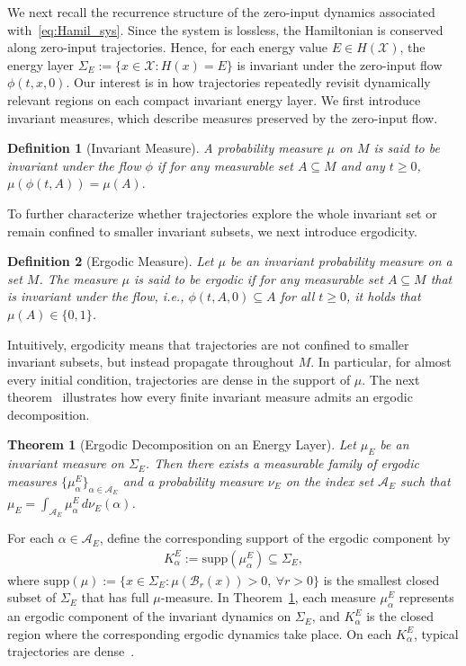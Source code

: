 \documentclass[letterpaper, 10 pt, conference]{ieeeconf}
\newtheorem{definition}{Definition}
\newtheorem{theorem}{Theorem}
\newcommand{\X}{\mathcal{X}}
\newcommand{\supp}{\mathrm{supp}}
\newcommand{\cB}{\mathcal{B}}
\newcommand{\cA}{\mathcal{A}}
\begin{document}
We next recall the recurrence structure of the zero-input dynamics associated with~\eqref{eq:Hamil_sys}. Since the system is lossless, the Hamiltonian is conserved along zero-input trajectories. Hence, for each energy value $E\in H(\X)$, the energy layer $\Sigma_E:=\{x\in\X:H(x)=E\}$
is invariant under the zero-input flow $\phi(t,x,0)$. Our interest is in how trajectories repeatedly revisit dynamically relevant regions on each compact invariant energy layer. We first introduce invariant measures, which describe measures preserved by the zero-input flow.


\begin{definition}[Invariant Measure]
A probability measure $\mu$ on $M$ is said to be invariant under the flow $\phi$ if for any measurable set $A \subseteq M$ and any $t \ge 0$, $\mu(\phi(t,A)) = \mu(A).$
\end{definition}

To further characterize whether trajectories explore the whole invariant set or remain confined to smaller invariant subsets, we next introduce ergodicity.

\begin{definition}[Ergodic Measure]
Let $\mu$ be an invariant probability measure on a set $M$. The measure $\mu$ is said to be ergodic if for any measurable set $A \subseteq M$ that is invariant under the flow, i.e., $\phi(t,A,0) \subseteq A$ for all $t \ge 0$, it holds that $\mu(A) \in \{0,1\}$.
\end{definition}

Intuitively, ergodicity means that trajectories are not confined to smaller invariant subsets, but instead propagate throughout $M$. In particular, for almost every initial condition, trajectories are dense in the support of $\mu$.
The next theorem~\cite[Theorem 5.1.3]{viana2016foundations} illustrates how every finite invariant measure admits an ergodic decomposition.

\begin{theorem}[Ergodic Decomposition on an Energy Layer]
\label{thm_ergodic}
Let $\mu_E$ be an invariant measure on $\Sigma_E$. Then there exists a measurable family of ergodic measures $\{\mu_\alpha^E\}_{\alpha\in\cA_E}$ and a probability measure $\nu_E$ on the index set $\cA_E$ such that
$\mu_E = \int_{\cA_E} \mu_\alpha^E\, d\nu_E(\alpha)$.
\end{theorem}
For each $\alpha\in\cA_E$, define the corresponding support of the ergodic component by
\begin{align*}
K_\alpha^E := \supp(\mu_\alpha^E)\subseteq \Sigma_E,
\end{align*}
where $\supp(\mu):=\{x\in \Sigma_E:\mu(\cB_r(x))>0,\ \forall r>0\}$ is the smallest closed subset of $\Sigma_E$ that has full $\mu$-measure. In Theorem~\ref{thm_ergodic}, each measure $\mu_\alpha^E$ represents an ergodic component of the invariant dynamics on $\Sigma_E$, and $K_\alpha^E$ is the closed region where the corresponding ergodic dynamics take place. On each $K_\alpha^E$, typical trajectories are dense~\cite[Proposition 4.3.5]{viana2016foundations}.
\end{document}
